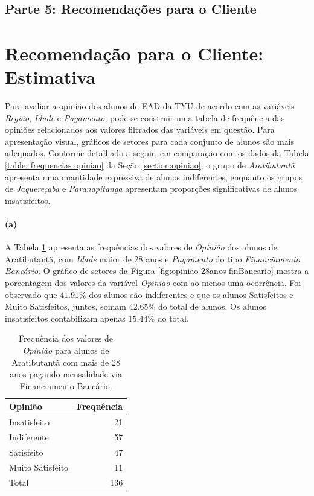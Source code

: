 \documentclass[10pt,a4paper,oneside]{article}
\newcommand{\arat}{Aratibutantã\xspace}
\newcommand{\jaqu}{Jaquereçaba\xspace}
\newcommand{\para}{Paranapitanga\xspace}
\begin{document}
\begin{center}
\section*{Parte 5: Recomendações para o Cliente}
\end{center}

\FloatBarrier
\section{Recomendação para o Cliente: Estimativa}
\label{section:estimativa}

Para avaliar a opinião dos alunos de EAD da TYU de acordo com as variáveis \textit{Região}, \textit{Idade} e \textit{Pagamento}, pode-se construir uma tabela de frequência das opiniões relacionados aos valores filtrados das variáveis em questão. Para apresentação visual, gráficos de setores para cada conjunto de alunos são mais adequados. Conforme detalhado a seguir, em comparação com os dados da Tabela \ref{table: frequencias opiniao} da Seção \ref{section:opiniao}, o grupo de \textit{\arat} apresenta uma quantidade expressiva de alunos indiferentes, enquanto os grupos de \textit{\jaqu} e \textit{\para} apresentam proporções significativas de alunos insatisfeitos.

\paragraph{(a)} A Tabela \ref{table:opiniao-28anos-finBancario} apresenta as frequências dos valores de \textit{Opinião} dos alunos de \arat, com \textit{Idade} maior de 28 anos e \textit{Pagamento} do tipo \textit{Financiamento Bancário}. O gráfico de setores da Figura \ref{fig:opiniao-28anos-finBancario} mostra a porcentagem dos valores da variável \textit{Opinião} com ao menos uma ocorrência.
Foi observado que $41.91\%$ dos alunos são indiferentes e que os alunos Satisfeitos e Muito Satisfeitos, juntos, somam $42.65\%$ do total de alunos. Os alunos insatisfeitos contabilizam apenas $15.44\%$ do total.


\begin{table}[!h]
	\small
	\centering
	\caption{Frequência dos valores de \textit{Opinião} para alunos de \arat com mais de 28 anos pagando mensalidade via Financiamento Bancário.}
	\label{table:opiniao-28anos-finBancario}
	\begin{tabular}{l r}
		\toprule
		\textbf{Opinião} & \textbf{Frequência} \\
		\midrule
		Insatisfeito     &  21 \\
		Indiferente      &  57 \\
		Satisfeito       &  47 \\
		Muito Satisfeito &  11 \\
		\midrule
		Total            &  136 \\
		\bottomrule
	\end{tabular}
\end{table}
\end{document}
